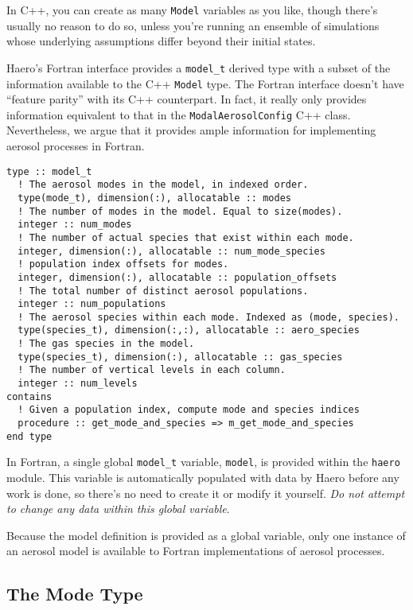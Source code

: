 In C++, you can create as many \texttt{Model} variables as you like, though
there's usually no reason to do so, unless you're running an ensemble of
simulations whose underlying assumptions differ beyond their initial states.

Haero's Fortran interface provides a \texttt{model\_t} derived type with a subset
of the information available to the C++ \texttt{Model} type. The Fortran
interface doesn't have ``feature parity'' with its C++ counterpart. In fact,
it really only provides information equivalent to that in the
\texttt{ModalAerosolConfig} C++ class. Nevertheless, we argue that it provides
ample information for implementing aerosol processes in Fortran.

\begin{lstlisting}
type :: model_t
  ! The aerosol modes in the model, in indexed order.
  type(mode_t), dimension(:), allocatable :: modes
  ! The number of modes in the model. Equal to size(modes).
  integer :: num_modes
  ! The number of actual species that exist within each mode.
  integer, dimension(:), allocatable :: num_mode_species
  ! population index offsets for modes.
  integer, dimension(:), allocatable :: population_offsets
  ! The total number of distinct aerosol populations.
  integer :: num_populations
  ! The aerosol species within each mode. Indexed as (mode, species).
  type(species_t), dimension(:,:), allocatable :: aero_species
  ! The gas species in the model.
  type(species_t), dimension(:), allocatable :: gas_species
  ! The number of vertical levels in each column.
  integer :: num_levels
contains
  ! Given a population index, compute mode and species indices
  procedure :: get_mode_and_species => m_get_mode_and_species
end type
\end{lstlisting}

In Fortran, a single global \texttt{model\_t} variable, \texttt{model}, is provided
within the \texttt{haero} module. This variable is automatically populated with
data by Haero before any work is done, so there's no need to create it or
modify it yourself. {\em Do not attempt to change any data within
this global variable}.

Because the model definition is provided as a global variable, only one instance
of an aerosol model is available to Fortran implementations of aerosol processes.

\subsection{The Mode Type}

